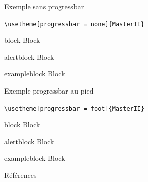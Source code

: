 \documentclass[french]{beamer}
\begin{document}
  {
  \begin{frame}[fragile]{Exemple sans progressbar}
    \begin{center}
      \verb;\usetheme[progressbar = none]{MasterII};
    \end{center}
        
    \begin{block}{block}
      Block
    \end{block}
    \begin{alertblock}{alertblock}
      Block
    \end{alertblock}
    \begin{exampleblock}{exampleblock}
      Block
    \end{exampleblock}
  \end{frame}
  }
  
  {
  \begin{frame}[fragile]{Exemple progressbar au pied}
    \begin{center}
      \verb;\usetheme[progressbar = foot]{MasterII};
    \end{center}
        
    \begin{block}{block}
      Block
    \end{block}
    \begin{alertblock}{alertblock}
      Block
    \end{alertblock}
    \begin{exampleblock}{exampleblock}
      Block
    \end{exampleblock}
  \end{frame}
  }
  
  
  
  \begin{frame}[allowframebreaks]{Références}
  
  \end{frame}
  
\end{document}
